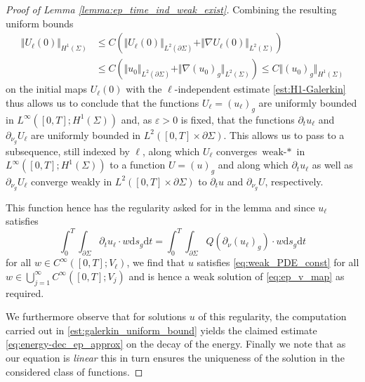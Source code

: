 \documentclass[10pt,a4paper]{amsart}
\newcommand{\Si}{\Sigma}
\newcommand{\beqas}{\begin{equation*}\begin{aligned}}
\newcommand{\dd}{\mathrm{d}} %
\newcommand{\eeqas}{\end{aligned}\end{equation*}}
\newcommand{\eps}{\varepsilon}
\newcommand{\na}{\nabla}
\newcommand{\norm}[1]{\Vert#1\Vert}
\newcommand{\p}{\partial} %
\newcommand{\pSi}{{\partial \Sigma}}
\begin{document}
\begin{proof}[Proof of Lemma \ref{lemma:ep_time_ind_weak_exist}]
    Combining the resulting uniform bounds 
    \beqas
        \norm{U_\ell(0)}_{H^1(\Si)}&\leq C(\norm{U_\ell(0)}_{L^2(\pSi)}+\norm{\na U_\ell(0)}_{L^2(\Si)})\\
        &\leq C(\norm{u_0}_{L^2(\pSi)}+\norm{\na (u_0)_g}_{L^2(\Si)})\leq C\norm{(u_0)_g}_{H^1(\Si)}
    \eeqas
    on the initial maps $U_\ell(0)$ with the $\ell$-independent estimate \eqref{est:H1-Galerkin} thus allows us to conclude that the functions $U_\ell=(u_\ell)_g$ are uniformly bounded in $L^\infty([0,T];H^1(\Si))$ and, as $\eps>0$ is fixed, that the functions $\p_t u_\ell$ and $\p_{\nu_g}U_\ell$ are uniformly bounded in $L^2([0,T]\times\p\Si)$. This allows us to pass to a subsequence, still indexed by $\ell$, along which $U_\ell$ converges $\text{weak-}*$ in $L^\infty([0,T];H^1(\Si))$ to a function $U=(u)_g$ and along which $\p_t u_\ell$ as well as $\p_{\nu_g}U_\ell$ converge weakly in $L^2([0,T]\times\p\Si)$ to $\p_t u$ and $\p_{\nu_g}U$, respectively.

    This function hence has the regularity asked for in the lemma and since $u_\ell$ satisfies 
    \begin{equation}\label{eq:weak_PDE_const}
        \int_0^T \int_{\p\Si}\p_t u_\ell \cdot w \dd s_g \dd t = \int_0^T \int_{\p\Si} Q(\p_\nu (u_\ell)_g) \cdot w\dd s_g \dd t
    \end{equation}
    for all $w \in C^{\infty}([0,T];V_\ell)$, we find that $u$ satisfies \eqref{eq:weak_PDE_const} for all $w \in \bigcup_{j=1}^\infty C^{\infty}([0,T];V_j)$ and is hence a weak solution of \eqref{eq:ep_v_map} as required. 

    
    We furthermore observe that for solutions $u$ of this regularity, the computation carried out in \eqref{est:galerkin_uniform_bound} yields the claimed estimate \eqref{eq:energy-dec_ep_approx} on the decay of the energy. Finally we note that as our equation is \textit{linear} this in turn ensures the uniqueness of the solution in the considered class of functions.
\end{proof}
\end{document}
